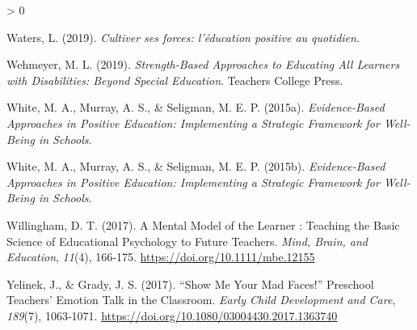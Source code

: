 \documentclass[
  french,
]{article}
\newlength{\cslhangindent}
\newenvironment{CSLReferences}[2] %
 {%
  \setlength{\parindent}{0pt}
  \ifodd #1 \everypar{\setlength{\hangindent}{\cslhangindent}}\ignorespaces\fi
  \ifnum #2 > 0
  \setlength{\parskip}{#2\baselineskip}
  \fi
 }%
 {}
\begin{document}
\begin{CSLReferences}{1}{0}
\leavevmode\hypertarget{ref-waters2019}{}%
Waters, L. (2019). \emph{{Cultiver ses forces: l'éducation positive au quotidien}}.

\leavevmode\hypertarget{ref-wehmeyer2019a}{}%
Wehmeyer, M. L. (2019). \emph{Strength-Based Approaches to Educating All Learners with Disabilities: Beyond Special Education}. {Teachers College Press}.

\leavevmode\hypertarget{ref-white2015a}{}%
White, M. A., Murray, A. S., \& Seligman, M. E. P. (2015a). \emph{Evidence-Based Approaches in Positive Education: Implementing a Strategic Framework for Well-Being in Schools}.

\leavevmode\hypertarget{ref-white2015c}{}%
White, M. A., Murray, A. S., \& Seligman, M. E. P. (2015b). \emph{Evidence-Based Approaches in Positive Education: Implementing a Strategic Framework for Well-Being in Schools}.

\leavevmode\hypertarget{ref-willingham2017}{}%
Willingham, D. T. (2017). A {Mental Model} of the {Learner} : {Teaching} the {Basic Science} of {Educational Psychology} to {Future Teachers}. \emph{Mind, Brain, and Education}, \emph{11}(4), 166‑175. \url{https://doi.org/10.1111/mbe.12155}

\leavevmode\hypertarget{ref-yelinek2017}{}%
Yelinek, J., \& Grady, J. S. (2017). {``{Show} Me Your Mad Faces!''} Preschool Teachers' Emotion Talk in the Classroom. \emph{Early Child Development and Care}, \emph{189}(7), 1063‑1071. \url{https://doi.org/10.1080/03004430.2017.1363740}

\end{CSLReferences}
\end{document}
